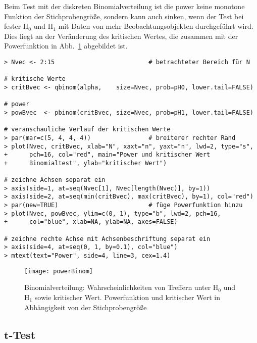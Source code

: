 Beim Test mit der diskreten Binomialverteilung ist die power keine monotone Funktion der Stichprobengröße, sondern kann auch sinken, wenn der Test bei fester $\text{H}_{0}$ und $\text{H}_{1}$ mit Daten von mehr Beobachtungsobjekten durchgeführt wird. Dies liegt an der Veränderung des kritischen Wertes, die zusammen mit der Powerfunktion in Abb.\ \ref{fig:powerBinom} abgebildet ist.
\begin{lstlisting}
> Nvec <- 2:15                          # betrachteter Bereich für N

# kritische Werte
> critBvec <- qbinom(alpha,    size=Nvec, prob=pH0, lower.tail=FALSE)

# power
> powBvec  <- pbinom(critBvec, size=Nvec, prob=pH1, lower.tail=FALSE)

# veranschauliche Verlauf der kritischen Werte
> par(mar=c(5, 4, 4, 4))                # breiterer rechter Rand
> plot(Nvec, critBvec, xlab="N", xaxt="n", yaxt="n", lwd=2, type="s",
+      pch=16, col="red", main="Power und kritischer Wert
+      Binomialtest", ylab="kritischer Wert")

# zeichne Achsen separat ein
> axis(side=1, at=seq(Nvec[1], Nvec[length(Nvec)], by=1))
> axis(side=2, at=seq(min(critBvec), max(critBvec), by=1), col="red")
> par(new=TRUE)                         # füge Powerfunktion hinzu
> plot(Nvec, powBvec, ylim=c(0, 1), type="b", lwd=2, pch=16,
+      col="blue", xlab=NA, ylab=NA, axes=FALSE)

# zeichne rechte Achse mit Achsenbeschriftung separat ein
> axis(side=4, at=seq(0, 1, by=0.1), col="blue")
> mtext(text="Power", side=4, line=3, cex=1.4)
\end{lstlisting}

\begin{figure}[ht]
\centering
\texttt{[image: powerBinom]}
\vspace*{-0.5em}
\caption{Binomialverteilung: Wahrscheinlichkeiten von Treffern unter $\text{H}_{0}$ und $\text{H}_{1}$ sowie kritischer Wert. Powerfunktion und kritischer Wert in Abhängigkeit von der Stichprobengröße}
\label{fig:powerBinom}
\end{figure}

\subsection[\texorpdfstring{$t$}{t}-Test]{$\bm{t}$-Test}

